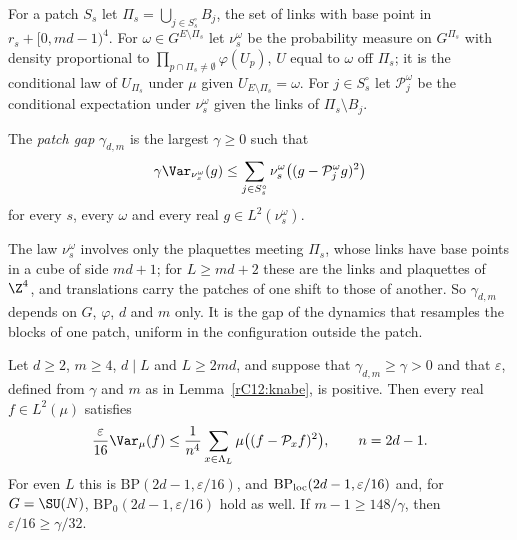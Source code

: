 For a patch $S_s$ let $\Pi_s=\bigcup_{j\in S^\circ_s}B_j$, the set of links
with base point in $r_s+[0,md-1)^4$. For $\omega\in G^{E\setminus\Pi_s}$ let
$\nu^\omega_s$ be the probability measure on $G^{\Pi_s}$ with density
proportional to $\prod_{p\cap\Pi_s\ne\emptyset}\varphi(U_p)$, $U$ equal to
$\omega$ off $\Pi_s$; it is the conditional law of $U_{\Pi_s}$ under $\mu$
given $U_{E\setminus\Pi_s}=\omega$. For $j\in S^\circ_s$ let
$\mathcal P^\omega_j$ be the conditional expectation under $\nu^\omega_s$
given the links of $\Pi_s\setminus B_j$.

\begin{definition}\label{rC12:patch}
The \emph{patch gap} $\gamma_{d,m}$ is the largest $\gamma\ge0$ such that
\[
\gamma\Var_{\nu^\omega_s}(g)\le\sum_{j\in S^\circ_s}\nu^\omega_s\bigl((g-
\mathcal P^\omega_jg)^2\bigr)
\]
for every $s$, every $\omega$ and every real $g\in L^2(\nu^\omega_s)$.
\end{definition}

The law $\nu^\omega_s$ involves only the plaquettes meeting $\Pi_s$, whose
links have base points in a cube of side $md+1$; for $L\ge md+2$ these are
the links and plaquettes of $\Z^4$, and translations carry the patches of
one shift to those of another. So $\gamma_{d,m}$ depends on $G$, $\varphi$,
$d$ and $m$ only. It is the gap of the dynamics that resamples the blocks of
one patch, uniform in the configuration outside the patch.

\begin{theorem}\label{rC12:finite}
Let $d\ge2$, $m\ge4$, $d\mid L$ and $L\ge2md$, and suppose that
$\gamma_{d,m}\ge\gamma>0$ and that $\varepsilon$, defined from $\gamma$ and
$m$ as in Lemma~\ref{rC12:knabe}, is positive. Then every real $f\in
L^2(\mu)$ satisfies
\[
\frac{\varepsilon}{16}\Var_\mu(f)\le\frac1{n^4}\sum_{x\in\Lambda_L}\mu\bigl(
(f-\mathcal P_xf)^2\bigr),\qquad n=2d-1.
\]
For even $L$ this is $\mathrm{BP}(2d-1,\varepsilon/16)$, and
$\mathrm{BP}_{\rm loc}(2d-1,\varepsilon/16)$ and, for $G=\SU(N)$,
$\mathrm{BP}_0(2d-1,\varepsilon/16)$ hold as well. If $m-1\ge148/\gamma$,
then $\varepsilon/16\ge\gamma/32$.
\end{theorem}

